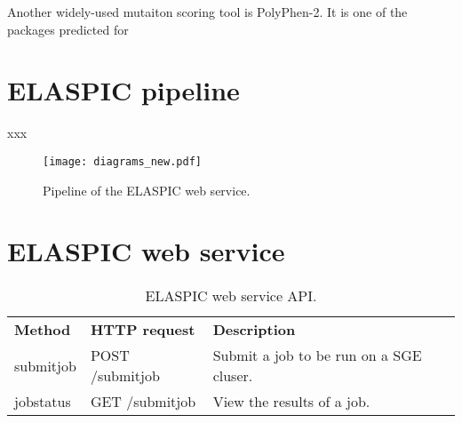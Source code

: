 Another widely-used mutaiton scoring tool is PolyPhen-2. It is one of the packages predicted for 






\section{ELASPIC pipeline}


xxx

\begin{figure}[H]
	\centering
	\texttt{[image: diagrams\_new.pdf]}
	\caption[pipeline]{Pipeline of the ELASPIC web service.}
\end{figure}



\section{ELASPIC web service}

\begin{table}[H]
	\centering
	\caption{ELASPIC web service API.}
	\label{my-label}
	\begin{tabular}{lll}
	\textbf{Method} & \textbf{HTTP request} & \textbf{Description} \\
	submitjob & POST /submitjob & Submit a job to be run on a SGE cluser. \\
	jobstatus & GET /submitjob & View the results of a job.
	\end{tabular}
\end{table}

